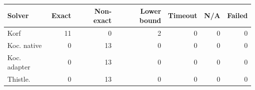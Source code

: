\begin{tabular}{p{}rrrrrr}
\hline
Solver & Exact & Non-exact & Lower bound & Timeout & N/A & Failed \\
\hline
Korf & 11 & 0 & 2 & 0 & 0 & 0 \\
Koc. native & 0 & 13 & 0 & 0 & 0 & 0 \\
Koc. adapter & 0 & 13 & 0 & 0 & 0 & 0 \\
Thistle. & 0 & 13 & 0 & 0 & 0 & 0 \\
\hline
\end{tabular}
